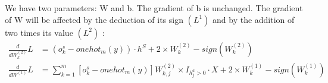 \documentclass[12pt]{article}
\begin{document}
\subsection{}
We have two parameters: W and b. The gradient of b is unchanged. The gradient of W will be affected by the deduction of its sign $(L^1)$ and by the addition of two times its value $(L^2)$ :
\begin{align*}
\frac{d}{dW^{(2)}_{k}} L & = (o^s_k-onehot_m(y)) \cdot h^S + 2 \times W^{(2)}_k - sign(W^{(2)}_k)\\ 
\frac{d}{dW^{(1)}} L & =  \sum\limits_{k=1}^m [o^s_k - onehot_m(y)]  W^{(2)}_{k,j} \times I_{h^a_j > 0} \cdot X+ 2 \times W^{(1)}_k - sign(W^{(1)}_k) \\
\end{align*}
\end{document}
